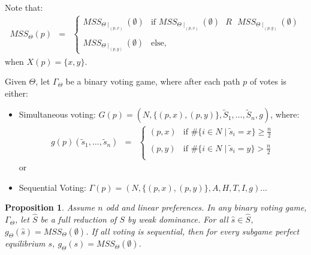 \documentclass[12pt]{article}
\newtheorem{propo}{Proposition}[section]
\newcommand{\n}{\noindent}
\newcommand{\s}{\vspace{5mm}}
\begin{document}
\s
\n Note that:
\begin{eqnarray*}
MSS_{\Theta}(p)&=&\left\{\begin{array}{cl}
MSS_{\Theta\mid_{(p,x)}}(\emptyset)&\mbox{if }MSS_{\Theta\mid_{(p,x)}}(\emptyset)\mbox{ }R\mbox{ }MSS_{\Theta\mid_{(p,y)}}(\emptyset)\\
&\\
MSS_{\Theta\mid_{(p,y)}}(\emptyset)&\mbox{else}, 
\end{array}\right.
\end{eqnarray*}when $X(p)=\{x,y\}$.

\s
\n  Given $\Theta$, let $\Gamma_{\Theta}$ be a binary voting game, where after each path $p$ of votes is either:
\begin{itemize}
\item Simultaneous voting: $G(p)=(N,\{(p,x),(p,y)\},\tilde{S}_1,\hdots,\tilde{S}_n,g)$, where:
\begin{eqnarray*}
g(p)(\tilde{s}_1,\hdots,\tilde{s}_n)&=&\left\{\begin{array}{cl}
(p,x) & \mbox{if }\#\{i\in N\mid \tilde{s}_i=x\}\geq\frac{n}{2}\\
&\\
(p,y) & \mbox{if }\#\{i\in N\mid \tilde{s}_i=y\}>\frac{n}{2}\\
\end{array}\right.
\end{eqnarray*} or
\item Sequential Voting: $\Gamma(p)=(N,\{(p,x),(p,y)\},A,H,T,I,g)$...
\end{itemize}

\s
\n\begin{propo}  Assume $n$ odd and linear preferences.  In any binary voting game, $\Gamma_{\Theta}$, let $\widehat{S}$ be a full reduction of $S$ by weak dominance.  For all $\widehat{s}\in\widehat{S}$, $g_{\Theta}(\widehat{s})=MSS_{\Theta}(\emptyset)$.  If all voting is sequential, then for every subgame perfect equilibrium $s$, $g_{\Theta}(s)=MSS_{\Theta}(\emptyset)$.
\end{propo}
\end{document}

